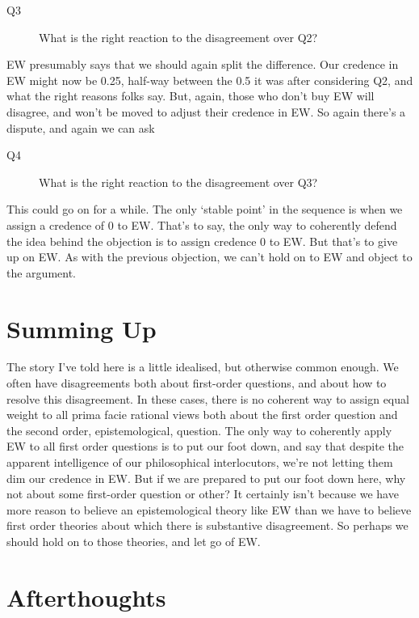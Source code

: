 \documentclass[
  11pt,
  letterpaper,
  DIV=11,
  numbers=noendperiod,
  oneside]{scrartcl}
\begin{document}
\begin{description}
\item[Q3]
What is the right reaction to the disagreement over Q2?
\end{description}

EW presumably says that we should again split the difference. Our
credence in EW might now be 0.25, half-way between the 0.5 it was after
considering Q2, and what the right reasons folks say. But, again, those
who don't buy EW will disagree, and won't be moved to adjust their
credence in EW. So again there's a dispute, and again we can ask

\begin{description}
\item[Q4]
What is the right reaction to the disagreement over Q3?
\end{description}

This could go on for a while. The only `stable point' in the sequence is
when we assign a credence of 0 to EW. That's to say, the only way to
coherently defend the idea behind the objection is to assign credence 0
to EW. But that's to give up on EW. As with the previous objection, we
can't hold on to EW and object to the argument.

\section{Summing Up}\label{summing-up}

The story I've told here is a little idealised, but otherwise common
enough. We often have disagreements both about first-order questions,
and about how to resolve this disagreement. In these cases, there is no
coherent way to assign equal weight to all prima facie rational views
both about the first order question and the second order,
epistemological, question. The only way to coherently apply EW to all
first order questions is to put our foot down, and say that despite the
apparent intelligence of our philosophical interlocutors, we're not
letting them dim our credence in EW. But if we are prepared to put our
foot down here, why not about some first-order question or other? It
certainly isn't because we have more reason to believe an
epistemological theory like EW than we have to believe first order
theories about which there is substantive disagreement. So perhaps we
should hold on to those theories, and let go of EW.

\newpage

\section*{Afterthoughts}\label{afterthoughts}
\end{document}
